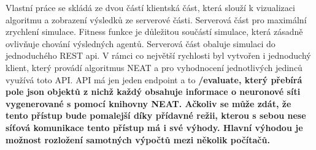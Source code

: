 Vlastní práce se skládá ze dvou částí klientská část, která slouží k vizualizaci algoritmu a zobrazení výsledků ze serverové části. Serverová část pro maximální zrychlení simulace. 
Fitness funkce je důležitou součástí simulace, která zásadně ovlivňuje chování výsledných agentů.
Serverová část obaluje simulaci do jednoduchého REST api. V rámci co největší rychlosti byl vytvořen i jednoduchý klient, který provádí algoritmus NEAT a pro vyhodnocení jednotlivých jedinců využívá toto API. API má jen jeden endpoint a to \bf{/evaluate}, který přebírá pole json objektů z nichž každý obsahuje informace o neuronové síti vygenerované s pomocí knihovny NEAT.
Ačkoliv se může zdát, že tento přístup bude pomalejší díky přídavné režii, kterou s sebou nese síťová komunikace tento přístup má i své výhody. Hlavní výhodou je možnost rozložení samotných výpočtů mezi několik počítačů.
